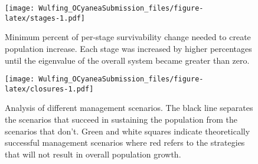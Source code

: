 \documentclass[
]{article}
\begin{document}
\begin{table}
\centering
\caption{\label{tab:lifetable}Stable stage distribution and reproductive value of each stage of this blue octopus population matrix given in Figure \ref{WriteMtxRounded}. The survivability (i.e.~the proportion of individuals who survive from stage i to stage i+1) in each stage includes death rate from fishing. Stages 1-4 survivability were calculated by summing up the proportion of individuals surviving and staying within a stage every month (\(P_i\)) and the proportion of individuals surviving and growing every month (\(G_i\)). Larval survivability of 0.0001328 was calculated by dividing our estimated number of larvae surviving back to stage 1 (\(F_4\)) by the average estimated reproductive output of \emph{O. cyanea}. \label{lifetable}}
\centering
{}
\end{table}



\begin{figure}
\centering
\texttt{[image: Wulfing\_OCyaneaSubmission\_files/figure-latex/stages-1.pdf]}
\caption{\label{fig:stages}Minimum percent of per-stage survivability change needed to create population increase. Each stage was increased by higher percentages until the eigenvalue of the overall system became greater than zero. \label{stages}}
\end{figure}



\begin{figure}
\centering
\texttt{[image: Wulfing\_OCyaneaSubmission\_files/figure-latex/closures-1.pdf]}
\caption{\label{fig:closures}Analysis of different management scenarios. The black line separates the scenarios that succeed in sustaining the population from the scenarios that don't. Green and white squares indicate theoretically successful management scenarios where red refers to the strategies that will not result in overall population growth. \label{closures}}
\end{figure}
\end{document}
